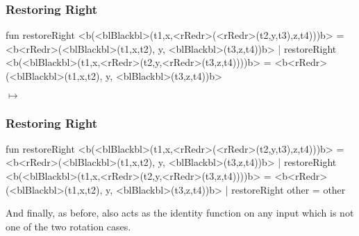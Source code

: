 \documentclass[aspectratio=169]{beamer}
\begin{document}
\begin{frame}[fragile]
  \frametitle{Restoring Right}

  \begin{codeblock}
    fun restoreRight <b(<blBlackbl>(t1,x,<rRedr>(<rRedr>(t2,y,t3),z,t4)))b> =
          <b<rRedr>(<blBlackbl>(t1,x,t2), y, <blBlackbl>(t3,z,t4))b>
      | restoreRight <b(<blBlackbl>(t1,x,<rRedr>(t2,y,<rRedr>(t3,z,t4))))b> =
          <b<rRedr>(<blBlackbl>(t1,x,t2), y, <blBlackbl>(t3,z,t4))b>
  \end{codeblock}

  \pause
  \begin{center}
    \begin{minipage}{0.35\textwidth}
      \centering
    \end{minipage}
    \pause
    \begin{minipage}{0.1\textwidth}
      \centering
      \large$\longmapsto$
    \end{minipage}
    \begin{minipage}{0.35\textwidth}
      \centering
    \end{minipage}
  \end{center}
\end{frame}

\begin{frame}[fragile]
  \frametitle{Restoring Right}

  \begin{codeblock}
    fun restoreRight <b(<blBlackbl>(t1,x,<rRedr>(<rRedr>(t2,y,t3),z,t4)))b> =
          <b<rRedr>(<blBlackbl>(t1,x,t2), y, <blBlackbl>(t3,z,t4))b>
      | restoreRight <b(<blBlackbl>(t1,x,<rRedr>(t2,y,<rRedr>(t3,z,t4))))b> =
          <b<rRedr>(<blBlackbl>(t1,x,t2), y, <blBlackbl>(t3,z,t4))b>
      | restoreRight other = other
  \end{codeblock}

  \pause
  \vspace{\fill}

  And finally, as before,  also acts as the identity function
  on any input which is not one of the two rotation cases.
\end{frame}
\end{document}
